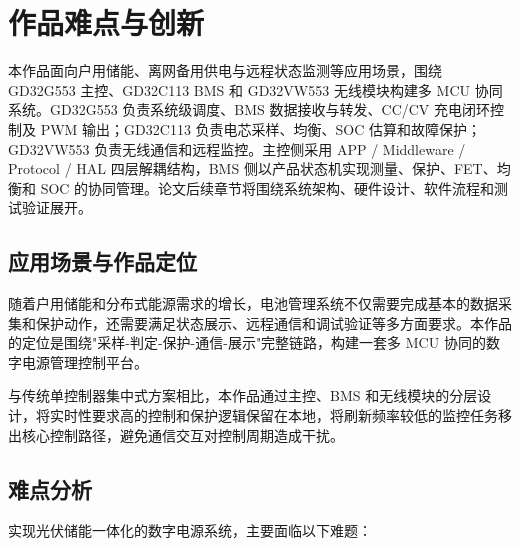\section{作品难点与创新}

本作品面向户用储能、离网备用供电与远程状态监测等应用场景，围绕 GD32G553 主控、GD32C113 BMS 和 GD32VW553 无线模块构建多 MCU 协同系统。GD32G553 负责系统级调度、BMS 数据接收与转发、CC/CV 充电闭环控制及 PWM 输出；GD32C113 负责电芯采样、均衡、SOC 估算和故障保护；GD32VW553 负责无线通信和远程监控。主控侧采用 APP / Middleware / Protocol / HAL 四层解耦结构，BMS 侧以产品状态机实现测量、保护、FET、均衡和 SOC 的协同管理。论文后续章节将围绕系统架构、硬件设计、软件流程和测试验证展开。

\subsection{应用场景与作品定位}

随着户用储能和分布式能源需求的增长，电池管理系统不仅需要完成基本的数据采集和保护动作，还需要满足状态展示、远程通信和调试验证等多方面要求。本作品的定位是围绕"采样-判定-保护-通信-展示"完整链路，构建一套多 MCU 协同的数字电源管理控制平台。

与传统单控制器集中式方案相比，本作品通过主控、BMS 和无线模块的分层设计，将实时性要求高的控制和保护逻辑保留在本地，将刷新频率较低的监控任务移出核心控制路径，避免通信交互对控制周期造成干扰。

\subsection{难点分析}

实现光伏储能一体化的数字电源系统，主要面临以下难题：

